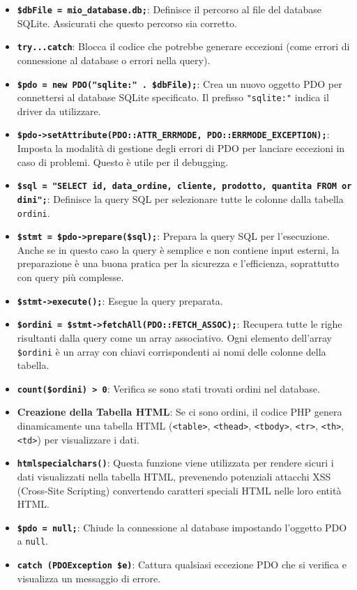 \documentclass[italian,a4paper]{article}
\providecommand{\tightlist}{%
  \setlength{\itemsep}{0pt}\setlength{\parskip}{0pt}}
\begin{document}
\begin{itemize}
\tightlist
\item
  \textbf{\texttt{\$dbFile\ =\ \textquotesingle{}mio\_database.db\textquotesingle{};}}:
  Definisce il percorso al file del database SQLite. Assicurati che
  questo percorso sia corretto.
\item
  \textbf{\texttt{try...catch}}: Blocca il codice che potrebbe generare
  eccezioni (come errori di connessione al database o errori nella
  query).
\item
  \textbf{\texttt{\$pdo\ =\ new\ PDO("sqlite:"\ .\ \$dbFile);}}: Crea un
  nuovo oggetto PDO per connettersi al database SQLite specificato. Il
  prefisso \texttt{"sqlite:"} indica il driver da utilizzare.
\item
  \textbf{\texttt{\$pdo-\textgreater{}setAttribute(PDO::ATTR\_ERRMODE,\ PDO::ERRMODE\_EXCEPTION);}}:
  Imposta la modalità di gestione degli errori di PDO per lanciare
  eccezioni in caso di problemi. Questo è utile per il debugging.
\item
  \textbf{\texttt{\$sql\ =\ "SELECT\ id,\ data\_ordine,\ cliente,\ prodotto,\ quantita\ FROM\ ordini";}}:
  Definisce la query SQL per selezionare tutte le colonne dalla tabella
  \texttt{ordini}.
\item
  \textbf{\texttt{\$stmt\ =\ \$pdo-\textgreater{}prepare(\$sql);}}:
  Prepara la query SQL per l'esecuzione. Anche se in questo caso la
  query è semplice e non contiene input esterni, la preparazione è una
  buona pratica per la sicurezza e l'efficienza, soprattutto con query
  più complesse.
\item
  \textbf{\texttt{\$stmt-\textgreater{}execute();}}: Esegue la query
  preparata.
\item
  \textbf{\texttt{\$ordini\ =\ \$stmt-\textgreater{}fetchAll(PDO::FETCH\_ASSOC);}}:
  Recupera tutte le righe risultanti dalla query come un array
  associativo. Ogni elemento dell'array \texttt{\$ordini} è un array con
  chiavi corrispondenti ai nomi delle colonne della tabella.
\item
  \textbf{\texttt{count(\$ordini)\ \textgreater{}\ 0}}: Verifica se sono
  stati trovati ordini nel database.
\item
  \textbf{Creazione della Tabella HTML}: Se ci sono ordini, il codice
  PHP genera dinamicamente una tabella HTML
  (\texttt{\textless{}table\textgreater{}},
  \texttt{\textless{}thead\textgreater{}},
  \texttt{\textless{}tbody\textgreater{}},
  \texttt{\textless{}tr\textgreater{}},
  \texttt{\textless{}th\textgreater{}},
  \texttt{\textless{}td\textgreater{}}) per visualizzare i dati.
\item
  \textbf{\texttt{htmlspecialchars()}}: Questa funzione viene utilizzata
  per rendere sicuri i dati visualizzati nella tabella HTML, prevenendo
  potenziali attacchi XSS (Cross-Site Scripting) convertendo caratteri
  speciali HTML nelle loro entità HTML.
\item
  \textbf{\texttt{\$pdo\ =\ null;}}: Chiude la connessione al database
  impostando l'oggetto PDO a \texttt{null}.
\item
  \textbf{\texttt{catch\ (PDOException\ \$e)}}: Cattura qualsiasi
  eccezione PDO che si verifica e visualizza un messaggio di errore.
\end{itemize}
\end{document}
